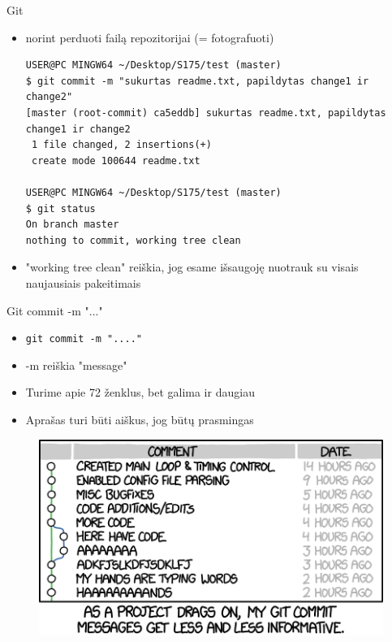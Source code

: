\documentclass[11pt,xcolor=table]{beamer}
\begin{document}
\begin{frame}[fragile]{Git}
\begin{itemize}

\item norint perduoti failą repozitorijai (= fotografuoti)
\begin{lstlisting}
USER@PC MINGW64 ~/Desktop/S175/test (master)
$ git commit -m "sukurtas readme.txt, papildytas change1 ir change2"
[master (root-commit) ca5eddb] sukurtas readme.txt, papildytas change1 ir change2
 1 file changed, 2 insertions(+)
 create mode 100644 readme.txt
 
USER@PC MINGW64 ~/Desktop/S175/test (master)
$ git status
On branch master
nothing to commit, working tree clean
\end{lstlisting}
\item "working tree clean" reiškia, jog esame išsaugoję nuotrauk su visais naujausiais pakeitimais
\end{itemize}
\end{frame}
\begin{frame}{Git commit -m "..."}
\begin{itemize}
\item \colorbox{listinggray}{\lstinline|git commit -m "...."|}
\item -m reiškia "message"
\item Turime apie 72 ženklus, bet galima ir daugiau
\item Aprašas turi būti aiškus, jog būtų prasmingas
\end{itemize}
\begin{figure}
\caption{\href{https://m.xkcd.com/1296/}{\color{blue}{https://m.xkcd.com/1296/}}}
\includegraphics[scale=0.5]{git_commit.png}
\end{figure}
\end{frame}
\end{document}

